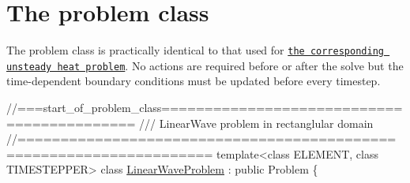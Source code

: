  

\hypertarget{index_problem}{}\section{The problem class}\label{index_problem}
The problem class is practically identical to that used for \href{../../../unsteady_heat/two_d_unsteady_heat/html/index.html}{\tt the corresponding unsteady heat problem}. No actions are required before or after the solve but the time-\/dependent boundary conditions must be updated before every timestep.

 
\begin{DoxyCodeInclude}
\textcolor{comment}{//===start\_of\_problem\_class===========================================}
\textcolor{comment}{/// LinearWave problem in rectanglular domain}
\textcolor{comment}{}\textcolor{comment}{//====================================================================}
\textcolor{keyword}{template}<\textcolor{keyword}{class} ELEMENT, \textcolor{keyword}{class} TIMESTEPPER>
\textcolor{keyword}{class }\hyperlink{classLinearWaveProblem}{LinearWaveProblem} : \textcolor{keyword}{public} Problem
\{


\end{DoxyCodeInclude}
